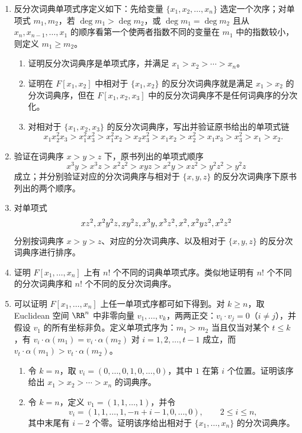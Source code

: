\begin{enumerate}[label=\arabic*.]
	\item 反分次词典单项式序定义如下：先给变量 $\{x_1,x_2,\ldots,x_n\}$ 选定一个次序；对单项式 $m_1,m_2$，若 $\deg m_1>\deg m_2$，或 $\deg m_1=\deg m_2$ 且从 $x_n,x_{n-1},\ldots,x_1$ 的顺序看第一个使两者指数不同的变量在 $m_1$ 中的指数较小，则定义 $m_1\geq m_2$。
	\begin{enumerate}[label=(\alph*)]
		\item 证明反分次词典序是单项式序，并满足 $x_1>x_2>\cdots>x_n$。
		\item 证明在 $F[x_1,x_2]$ 中相对于 $\{x_1,x_2\}$ 的反分次词典序就是满足 $x_1>x_2$ 的分次词典序，但在 $F[x_1,x_2,x_3]$ 中的反分次词典序不是任何词典序的分次化。
		\item 对相对于 $\{x_1,x_2,x_3\}$ 的反分次词典序，写出并验证原书给出的单项式链
		\[
		x_1x_2^2x_3>x_1^2x_3^2>x_1^2x_2>x_2x_3^2>x_1x_2>x_2^2>x_1x_3>x_3^2>x_1>x_2.
		\]
	\end{enumerate}
	
	\item 验证在词典序 $x>y>z$ 下，原书列出的单项式顺序
	\[
	x^3y>x^3z>x^2z^2>xyz>x^2y>xz^2>y^2z^2>y^2z
	\]
	成立；并分别验证对应的分次词典序与相对于 $\{x,y,z\}$ 的反分次词典序下原书列出的两个顺序。
	
	\item 对单项式
	\[
	xz^2,\\ x^2y^2z,
	xy^2z,
	x^3y,
	x^3z^2,
	x^2,
	x^2yz^2,
	x^2z^2
	\]
	分别按词典序 $x>y>z$、对应的分次词典序、以及相对于 $\{x,y,z\}$ 的反分次词典序进行排序。
	
	\item 证明 $F[x_1,\ldots,x_n]$ 上有 $n!$ 个不同的词典单项式序。类似地证明有 $n!$ 个不同的分次词典序和 $n!$ 个不同的反分次词典序。
	
	\item 可以证明 $F[x_1,\ldots,x_n]$ 上任一单项式序都可如下得到。对 $k\geq n$，取 Euclidean 空间 $\RR^n$ 中非零向量 $v_1,
	\ldots,v_k$，两两正交：$v_i\cdot v_j=0$（$i\neq j$），并假设 $v_1$ 的所有坐标非负。定义单项式序为：$m_1>m_2$ 当且仅当对某个 $t\leq k$，有 $v_i\cdot\alpha(m_1)=v_i\cdot\alpha(m_2)$ 对 $i=1,2,\ldots,t-1$ 成立，而 $v_t\cdot\alpha(m_1)>v_t\cdot\alpha(m_2)$。
	\begin{enumerate}[label=(\alph*)]
		\item 令 $k=n$，取 $v_i=(0,\ldots,0,1,0,\ldots,0)$，其中 $1$ 在第 $i$ 个位置。证明该序给出 $x_1>x_2>\cdots>x_n$ 的词典序。
		\item 令 $k=n$，定义 $v_1=(1,1,\ldots,1)$，并令
		\[
		v_i=(1,1,\ldots,1,-n+i-1,0,\ldots,0),
		\qquad 2\leq i\leq n,
		\]
		其中末尾有 $i-2$ 个零。证明该序给出相对于 $\{x_1,\ldots,x_n\}$ 的分次词典序。
	\end{enumerate}
	

\end{enumerate}
